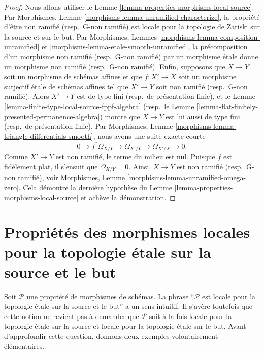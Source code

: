 \begin{proof}
Nous allons utiliser le
Lemme \ref{lemma-properties-morphisms-local-source}.
Par Morphismes, Lemme \ref{morphisms-lemma-unramified-characterize},
la propriété d'être non ramifié (resp.\ G-non ramifié)
est locale pour la topologie de Zariski sur la source et sur le but. Par
Morphismes, Lemmes \ref{morphisms-lemma-composition-unramified} et
\ref{morphisms-lemma-etale-smooth-unramified},
la précomposition d'un morphisme non ramifié (resp.\ G-non ramifié)
par un morphisme \'etale donne un morphisme non ramifié
(resp.\ G-non ramifié).
Enfin, supposons que $X \to Y$ soit un morphisme de schémas affines et que
$f : X' \to X$ soit un morphisme surjectif \'etale de schémas affines tel que
$X' \to Y$ soit non ramifié (resp.\ G-non ramifié).
Alors $X' \to Y$ est de type fini (resp.\ de présentation finie), et le
Lemme \ref{lemma-finite-type-local-source-fppf-algebra}
(resp.\ le Lemme \ref{lemma-flat-finitely-presented-permanence-algebra})
montre que $X \to Y$ est lui aussi de type fini
(resp.\ de présentation finie). Par
Morphismes, Lemme \ref{morphisms-lemma-triangle-differentials-smooth},
nous avons une suite exacte courte
$$
0 \to f^*\Omega_{X/Y} \to \Omega_{X'/Y} \to \Omega_{X'/X} \to 0.
$$
Comme $X' \to Y$ est non ramifié, le terme du milieu est nul.
Puisque $f$ est fidèlement plat, il s'ensuit que $\Omega_{X/Y} = 0$.
Ainsi, $X \to Y$ est non ramifié (resp.\ G-non ramifié), voir
Morphismes, Lemme \ref{morphisms-lemma-unramified-omega-zero}.
Cela démontre la dernière hypothèse du
Lemme \ref{lemma-properties-morphisms-local-source}
et achève la démonstration.
\end{proof}




\section{Propriétés des morphismes locales pour la topologie \'etale sur la source et le but}
\label{section-properties-etale-local-source-target}

\noindent
Soit $\mathcal{P}$ une propriété de morphismes de schémas. La phrase
``$\mathcal{P}$ est locale pour la topologie \'etale sur la source et le but''
a un sens intuitif. Il s'avère toutefois que cette notion ne revient pas à
demander que $\mathcal{P}$ soit à la fois locale pour la topologie \'etale
sur la source et locale pour la topologie \'etale sur le but.
Avant d'approfondir cette question, donnons deux exemples volontairement
élémentaires.

